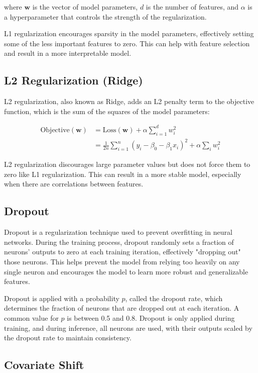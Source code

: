 \documentclass[12pt]{article}
\begin{document}
where $\boldsymbol{w}$ is the vector of model parameters, $d$ is the number of features, and $\alpha$ is a hyperparameter that controls the strength of the regularization.

L1 regularization encourages sparsity in the model parameters, effectively setting some of the less important features to zero. This can help with feature selection and result in a more interpretable model.

\subsection{L2 Regularization (Ridge)}

L2 regularization, also known as Ridge, adds an L2 penalty term to the objective function, which is the sum of the squares of the model parameters:

\begin{align*}
	\text{Objective}(\boldsymbol{w}) &= \text{Loss}(\boldsymbol{w}) + \alpha \sum_{i=1}^{d} w_i^2\\
	&= \frac{1}{2n} \sum_{i=1}^n (y_i - \beta_0 - \beta_1 x_i)^2 + \alpha \sum_i w_i^2
\end{align*}

L2 regularization discourages large parameter values but does not force them to zero like L1 regularization. This can result in a more stable model, especially when there are correlations between features.

\subsection{Dropout}

Dropout is a regularization technique used to prevent overfitting in neural networks. During the training process, dropout randomly sets a fraction of neurons' outputs to zero at each training iteration, effectively "dropping out" those neurons. This helps prevent the model from relying too heavily on any single neuron and encourages the model to learn more robust and generalizable features.

Dropout is applied with a probability $p$, called the dropout rate, which determines the fraction of neurons that are dropped out at each iteration. A common value for $p$ is between 0.5 and 0.8. Dropout is only applied during training, and during inference, all neurons are used, with their outputs scaled by the dropout rate to maintain consistency.

\subsection{Covariate Shift}
\end{document}
